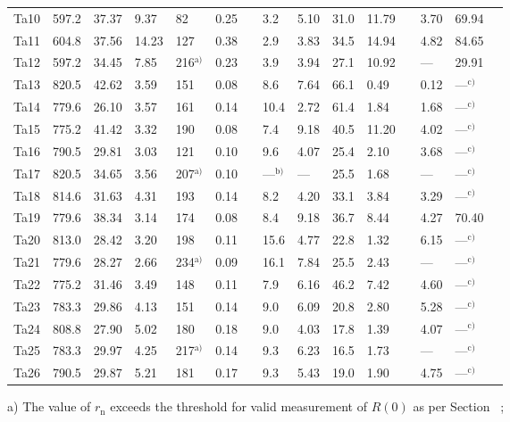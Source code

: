 \documentclass[12pt,onecolumn]{article}
\makeatletter
\DeclareRobustCommand*{\nameref}[1]{%
      \emph{\myorg@nameref{#1}}%
    }%
\makeatother
\begin{document}
\begin{bibunit}
\begin{table}
{\begin{threeparttable}
\begin{tabular}{rllllllllllllll}
Ta10 & 597.2 & 37.37 & 9.37 &   82 & 0.25 &  &  3.2 & 5.10 & 31.0 & 11.79 &  & 3.70 &69.94 \\ 
Ta11 & 604.8 & 37.56 & 14.23 &  127 & 0.38 &  &  2.9 & 3.83 & 34.5 & 14.94 &  & 4.82 &84.65 \\ 
Ta12 & 597.2 & 34.45 & 7.85 &  216$^\text{a)}$ & 0.23 &  &  3.9 & 3.94 & 27.1 & 10.92 &  & --- &29.91 \\ 
Ta13 & 820.5 & 42.62 & 3.59 &  151 & 0.08 &  &  8.6 & 7.64 & 66.1 & 0.49 &  & 0.12 &---$^\text{c)}$\\ 
Ta14 & 779.6 & 26.10 & 3.57 &  161 & 0.14 &  & 10.4 & 2.72 & 61.4 & 1.84 &  & 1.68 &---$^\text{c)}$\\ 
Ta15 & 775.2 & 41.42 & 3.32 &  190 & 0.08 &  &  7.4 & 9.18 & 40.5 & 11.20 &  & 4.02 &---$^\text{c)}$\\ 
Ta16 & 790.5 & 29.81 & 3.03 &  121 & 0.10 &  &  9.6 & 4.07 & 25.4 & 2.10 &  & 3.68 &---$^\text{c)}$\\ 
Ta17 & 820.5 & 34.65 & 3.56 &  207$^\text{a)}$ & 0.10 &  & ---$^\text{b)}$ & --- &25.5 & 1.68 &  & --- &---$^\text{c)}$\\ 
Ta18 & 814.6 & 31.63 & 4.31 &  193 & 0.14 &  &  8.2 & 4.20 & 33.1 & 3.84 &  & 3.29 &---$^\text{c)}$\\ 
Ta19 & 779.6 & 38.34 & 3.14 &  174 & 0.08 &  &  8.4 & 9.18 & 36.7 & 8.44 &  & 4.27 &70.40 \\ 
Ta20 & 813.0 & 28.42 & 3.20 &  198 & 0.11 &  & 15.6 & 4.77 & 22.8 & 1.32 &  & 6.15 &---$^\text{c)}$\\ 
Ta21 & 779.6 & 28.27 & 2.66 &  234$^\text{a)}$ & 0.09 &  & 16.1 & 7.84 & 25.5 & 2.43 &  & --- &---$^\text{c)}$\\
Ta22 & 775.2 & 31.46 & 3.49 &  148 & 0.11 &  &  7.9 & 6.16 & 46.2 & 7.42 &  & 4.60 &---$^\text{c)}$\\ 
Ta23 & 783.3 & 29.86 & 4.13 &  151 & 0.14 &  &  9.0 & 6.09 & 20.8 & 2.80 &  & 5.28 &---$^\text{c)}$\\ 
Ta24 & 808.8 & 27.90 & 5.02 &  180 & 0.18 &  &  9.0 & 4.03 & 17.8 & 1.39 &  & 4.07 &---$^\text{c)}$\\ 
Ta25 & 783.3 & 29.97 & 4.25 &  217$^\text{a)}$ & 0.14 &  &  9.3 & 6.23 & 16.5 & 1.73 &  & --- &---$^\text{c)}$\\
Ta26 & 790.5 & 29.87 & 5.21 &  181 & 0.17 &  &  9.3 & 5.43 & 19.0 & 1.90 &  & 4.75 &---$^\text{c)}$\\ 
\bottomrule
\end{tabular}
\begin{tablenotes}
\item[a)] {\footnotesize The value of $r_\mathrm{n}$ exceeds the threshold for valid measurement of $R(0)$ as per Section~\nameref{sec:Gc};
}
\end{tablenotes}
\end{threeparttable}}
\end{table}
\end{bibunit}
\end{document}

